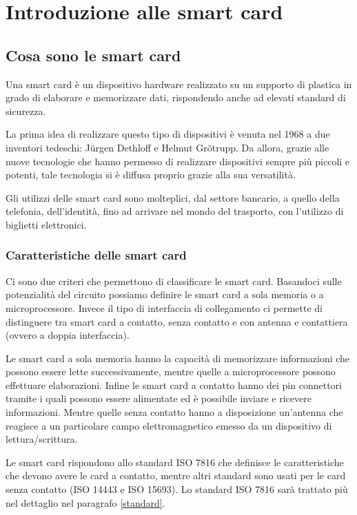 \chapter{Introduzione alle smart card}
\label{chapter1}

\section{Cosa sono le smart card}
\label{intro}
Una smart card è un dispositivo hardware realizzato su un supporto di plastica in grado di elaborare e memorizzare dati, rispondendo anche ad elevati standard di sicurezza.

La prima idea di realizzare questo tipo di dispositivi è venuta nel 1968 a due inventori tedeschi: Jürgen Dethloff e Helmut Grötrupp. Da allora, grazie alle nuove tecnologie che hanno permesso di realizzare dispositivi sempre più piccoli e potenti, tale tecnologia si è diffusa proprio grazie alla sua versatilità.

Gli utilizzi delle smart card sono molteplici, dal settore bancario, a quello della telefonia, dell'identità, fino ad arrivare nel mondo del trasporto, con l'utilizzo di biglietti elettronici.
\cite{wiki_sc}

\subsection{Caratteristiche  delle smart card}

Ci sono due criteri che permettono di classificare le smart card. Basandoci sulle potenzialità del circuito possiamo definire le smart card a sola memoria o a microprocessore. Invece il tipo di interfaccia di collegamento ci permette di distinguere tra smart card a contatto, senza contatto e con antenna e contattiera (ovvero a doppia interfaccia).

Le smart card a sola memoria hanno la capacità di memorizzare informazioni che possono essere lette successivamente, mentre quelle a microprocessore possono effettuare elaborazioni. Infine le smart card a contatto hanno dei pin connettori tramite i quali possono essere alimentate ed è possibile inviare e ricevere informazioni. Mentre quelle senza contatto hanno a disposizione un'antenna che reagisce a un particolare campo elettromagnetico emesso da un dispositivo di lettura/scrittura.

Le smart card rispondono allo standard ISO 7816 che definisce le caratteristiche che devono avere le card a contatto, mentre altri standard sono usati per le card senza contatto (ISO 14443 e ISO 15693). Lo standard ISO 7816 sarà trattato più nel dettaglio nel paragrafo \ref{standard}.

